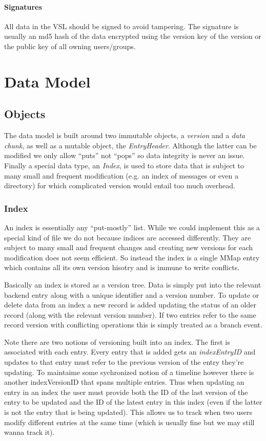 \documentclass[10pt]{article}
\begin{document}
\paragraph{Signatures}

All data in the VSL should be signed to avoid tampering.  The signature is usually an md5 hash of the data encrypted using the version key of the version or the public key of all owning users/groups.

\section{Data Model}

\subsection{Objects}

The data model is built around two immutable objects, a {\em version} and a {\em
data chunk}, as well as a mutable object, the {\em EntryHeader}.  Although the latter
can be modified we only allow ``puts'' not ``pops'' so data integrity is never
an issue.  Finally a special data type, an {\em Index}, is used to store data that
is subject to many small and frequent modification (e.g. an index of messages or
even a directory) for which complicated version would entail too much overhead.

\subsubsection{Index}

An index is essentially any ``put-mostly'' list.  While we could implement this
as a special kind of file we do not because indices are accessed differently.
They are subject to many small and frequent changes and creating new versions
for each modification does not seem efficient.  So instead the index is a single
MMap entry which contains all its own version hisotry and is immune to write
conflicts.  

Basically an index is stored as a version tree.  Data is simply put into the
relevant backend entry along with a unique identifier and a version number.  To
update or delete data from an index a new record is added updating the status of
an older record (along with the relevant version number).  If two entries refer
to the same record version with conflicting operations this is simply treated as
a branch event.

Note there are two notions of versioning built into an index.  The first is
associated with each entry.  Every entry that is added gets an {\em
indexEntryID} and updates to that entry must refer to the previous version of
the entry they're updating.  To maintaime some sychronized notion of a timeline
however there is another indexVersionID that spans multiple entries.  Thus when
updating an entry in an index the user must provide both the ID of the last
version of the entry to be updated and the ID of the latest entry in this index
(even if the latter is not the entry that is being updated).  This allows us to
track when two users modify different entries at the same time (which is usually
fine but we may still wanna track it).
\end{document}
